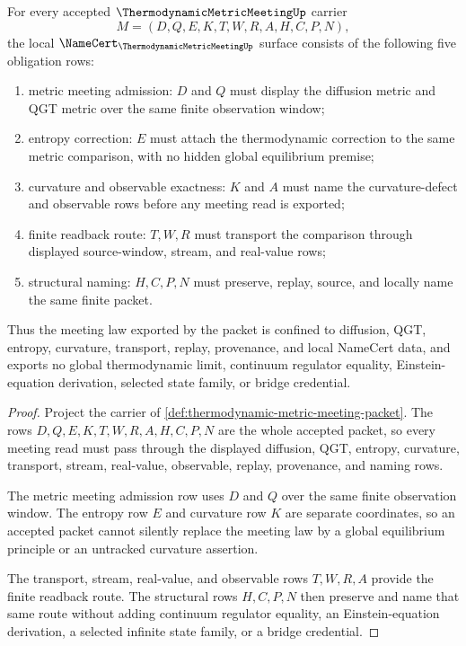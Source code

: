 \begin{theorem}
\label{thm:thermodynamic-metric-meeting-namecert-obligations}
For every accepted $\ThermodynamicMetricMeetingUp$ carrier
$$
M=(D,Q,E,K,T,W,R,A,H,C,P,N),
$$
the local $\NameCert_{\ThermodynamicMetricMeetingUp}$ surface consists of the following five obligation rows:
\begin{enumerate}
\item metric meeting admission: $D$ and $Q$ must display the diffusion metric and QGT metric over the same finite observation window;
\item entropy correction: $E$ must attach the thermodynamic correction to the same metric comparison, with no hidden global equilibrium premise;
\item curvature and observable exactness: $K$ and $A$ must name the curvature-defect and observable rows before any meeting read is exported;
\item finite readback route: $T,W,R$ must transport the comparison through displayed source-window, stream, and real-value rows;
\item structural naming: $H,C,P,N$ must preserve, replay, source, and locally name the same finite packet.
\end{enumerate}
Thus the meeting law exported by the packet is confined to diffusion, QGT, entropy, curvature, transport, replay, provenance, and local NameCert data, and exports no global thermodynamic limit, continuum regulator equality, Einstein-equation derivation, selected state family, or bridge credential.
\end{theorem}
\begin{proof}
Project the carrier of \autoref{def:thermodynamic-metric-meeting-packet}. The rows $D,Q,E,K,T,W,R,A,H,C,P,N$ are the whole accepted packet, so every meeting read must pass through the displayed diffusion, QGT, entropy, curvature, transport, stream, real-value, observable, replay, provenance, and naming rows.

The metric meeting admission row uses $D$ and $Q$ over the same finite observation window. The entropy row $E$ and curvature row $K$ are separate coordinates, so an accepted packet cannot silently replace the meeting law by a global equilibrium principle or an untracked curvature assertion.

The transport, stream, real-value, and observable rows $T,W,R,A$ provide the finite readback route. The structural rows $H,C,P,N$ then preserve and name that same route without adding continuum regulator equality, an Einstein-equation derivation, a selected infinite state family, or a bridge credential.
\end{proof}

